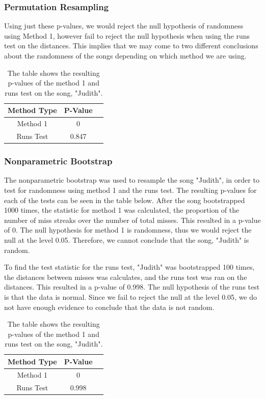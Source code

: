 \documentclass[12pt, letterpaper]{article}
\begin{document}
\subsubsection{Permutation Resampling}
Using just these p-values, we would reject the null hypothesis of randomness using Method 1, however fail to reject the null hypothesis when using the runs test on the distances. This implies that we may come to two different conclusions about the randomness of the songs depending on which method we are using. 
\begin{table}[h]
\begin{center}
\begin{tabular}{|c|c|c|}
\hline
\textbf{Method Type} & P-Value \\
\hline
Method 1 & 0 \\
\hline
Runs Test & 0.847 \\ 
\hline
\end{tabular}
\end{center}
\caption{The table shows the resulting p-values of the method 1 and runs test on the song, "Judith".}
\label{fig: P-values for "Judith": Permutation Resampling}
\end{table}

\subsubsection{Nonparametric Bootstrap}
The nonparametric bootstrap was used to resample the song "Judith", in order to test for randomness using method 1 and the runs test. The resulting p-values for each of the tests can be seen in the table below. After the song bootstrapped 1000 times, the statistic for method 1 was calculated, the proportion of the number of miss streaks over the number of total misses. This resulted in a p-value of 0. The null hypothesis for method 1 is randomness, thus we would reject the null at the level 0.05. Therefore, we cannot conclude that the song, "Judith" is random. 

To find the test statistic for the runs test, "Judith" was bootstrapped 100 times, the distances between misses was calculates, and the runs test was ran on the distances. This resulted in a p-value of 0.998. The null hypothesis of the runs test is that the data is normal. Since we fail to reject the null at the level 0.05, we do not have enough evidence to conclude that the data is not random.
\begin{table}[h]
\begin{center}
\begin{tabular}{|c|c|c|}
\hline
\textbf{Method Type} & P-Value \\
\hline
Method 1 & 0 \\
\hline
Runs Test & 0.998 \\ 
\hline
\end{tabular}
\end{center}
\caption{The table shows the resulting p-values of the method 1 and runs test on the song, "Judith".}
\label{fig: P-values for "Judith": Nonparametric Bootstrap}
\end{table}
\end{document}
